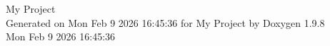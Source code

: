 \documentclass[twoside]{book}
\newcommand{\+}{\discretionary{\mbox{\scriptsize$\hookleftarrow$}}{}{}}
\newcommand{\clearemptydoublepage}{%
    \newpage{\pagestyle{empty}\cleardoublepage}%
  }
\begin{document}
  \raggedbottom
    \hypersetup{pageanchor=false,
                bookmarksnumbered=true,
                pdfencoding=unicode
               }
  \begin{titlepage}
  \vspace*{7cm}
  \begin{center}%
  {\Large My Project}\\
  \vspace*{1cm}
  {\large Generated on Mon Feb 9 2026 16\+:45\+:36 for My Project by Doxygen 1.9.8}\\
    \vspace*{0.5cm}
    {\small Mon Feb 9 2026 16:45:36}
  \end{center}
  \end{titlepage}
  \clearemptydoublepage
  \tableofcontents
  \clearemptydoublepage
  \hypersetup{pageanchor=true}

  \backmatter
  \newpage
  \clearemptydoublepage
  \printindex
\end{document}

